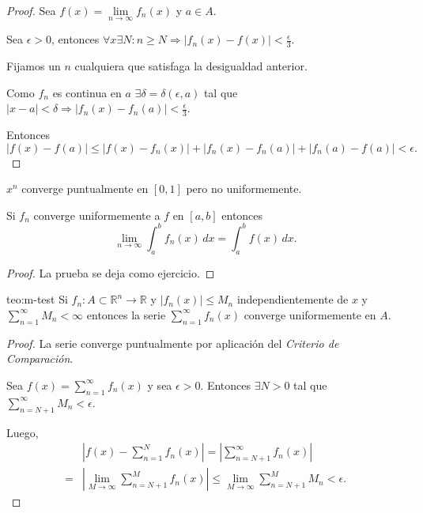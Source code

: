 \begin{proof}
Sea $f(x)=\lim\limits_{n \to \infty} f_n(x)$ y $a \in A$. 

Sea $\epsilon>0$, entonces $\forall x \exists N: n\geq N\Rightarrow|f_n(x)-f(x)|<\frac{\epsilon}{3} $. 

Fijamos un $n$ cualquiera que satisfaga la desigualdad anterior.

Como $f_n$ es continua en $a$ $\exists \delta=\delta(\epsilon,a)$ tal que 
$|x-a|<\delta \Rightarrow |f_n(x)-f_n(a)|<\frac{\epsilon}{3}$. 

Entonces 
\[
|f(x)-f(a)|\leq |f(x)-f_n(x)|+|f_n(x)-f_n(a)|+|f_n(a)-f(a)|<\epsilon.
\]
\end{proof}

\begin{ejemplo}{}
$x^n$ converge puntualmente en $[0,1]$ pero no uniformemente.
\end{ejemplo}

\begin{teorema}{}
Si $f_n$ converge uniformemente a $f$ en $[a,b]$ entonces
\[
\lim\limits_{n \to \infty} \int_a^b f_n(x)\,dx=\int_a^b f(x)\,dx.
\]
\end{teorema}

\begin{proof}
La prueba se deja como ejercicio.
\end{proof}

\begin{teorema}{teo:m-test}
Si $f_n:A\subset \mathbb{R}^n \to \mathbb{R}$ y $|f_n(x)|\leq M_n$ independientemente de $x$
y $\sum\limits_{n=1}^{\infty} M_n<\infty$ entonces la serie $\sum\limits_{n=1}^{\infty}f_n(x)$
converge uniformemente en $A$.
\end{teorema}

\begin{proof}
La serie converge puntualmente por aplicación del \textit{Criterio de Comparación}.

Sea $f(x)=\sum\limits_{n=1}^{\infty} f_n(x)$ y sea $\epsilon>0$.
Entonces $\exists N>0 $ tal que $\sum\limits_{n=N+1}^{\infty} M_n<\epsilon$. 

Luego, 
\[
\begin{split}
&\left|f(x)-\sum\limits_{n=1}^{N} f_n(x)\right|=\left|\sum\limits_{n=N+1}^{\infty} f_n(x)\right|
\\
=&\left|\lim\limits_{M\to \infty} \sum\limits_{n=N+1}^{M} f_n(x)\right|
\leq \lim\limits_{M\to \infty} \sum\limits_{n=N+1}^{M} M_n
<\epsilon.
\end{split}\]
\end{proof}

